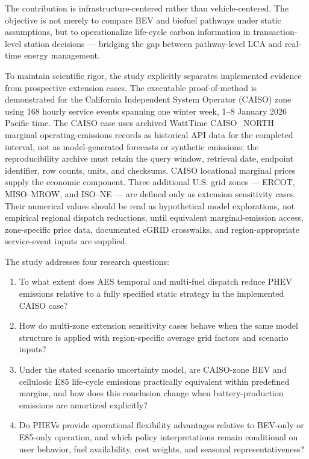 \documentclass[cleantechnol,article,submit,pdftex,moreauthors]{Definitions/mdpi}
\begin{document}
The contribution is infrastructure-centered rather than vehicle-centered. The objective is not merely to compare BEV and biofuel pathways under static assumptions, but to operationalize life-cycle carbon information in transaction-level station decisions --- bridging the gap between pathway-level LCA and real-time energy management.

To maintain scientific rigor, the study explicitly separates implemented evidence from prospective extension cases. The executable proof-of-method is demonstrated for the California Independent System Operator (CAISO) zone using 168 hourly service events spanning one winter week, 1--8 January 2026 Pacific time. The CAISO case uses archived WattTime CAISO\_NORTH marginal operating-emissions records as historical API data for the completed interval, not as model-generated forecasts or synthetic emissions; the reproducibility archive must retain the query window, retrieval date, endpoint identifier, row counts, units, and checksums. CAISO locational marginal prices supply the economic component. Three additional U.S. grid zones --- ERCOT, MISO--MROW, and ISO--NE --- are defined only as extension sensitivity cases. Their numerical values should be read as hypothetical model explorations, not empirical regional dispatch reductions, until equivalent marginal-emission access, zone-specific price data, documented eGRID crosswalks, and region-appropriate service-event inputs are supplied.

The study addresses four research questions:
\begin{enumerate}
	\item To what extent does AES temporal and multi-fuel dispatch reduce PHEV emissions relative to a fully specified static strategy in the implemented CAISO case?
	\item How do multi-zone extension sensitivity cases behave when the same model structure is applied with region-specific average grid factors and scenario inputs?
	\item Under the stated scenario uncertainty model, are CAISO-zone BEV and cellulosic E85 life-cycle emissions practically equivalent within predefined margins, and how does this conclusion change when battery-production emissions are amortized explicitly?
	\item Do PHEVs provide operational flexibility advantages relative to BEV-only or E85-only operation, and which policy interpretations remain conditional on user behavior, fuel availability, cost weights, and seasonal representativeness?
\end{enumerate}
\end{document}
